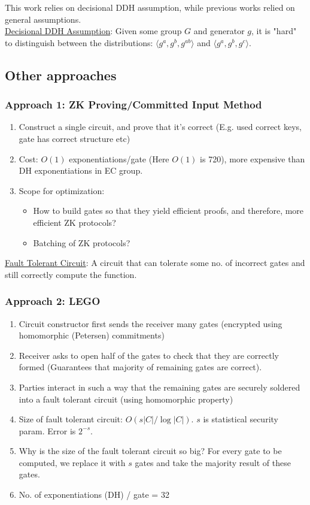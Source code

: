 This work relies on decisional DDH assumption, while previous works relied on general assumptions. \\

\underline{Decisional DDH Assumption}: Given some group $G$ and generator $g$, it is "hard" to distinguish between the distributions: $\langle g^a, g^b, g^{ab}\rangle$ and $\langle g^a, g^b, g^c\rangle$.

\subsection{Other approaches}

\subsubsection{Approach 1: ZK Proving/Committed Input Method}
\begin{enumerate}
    \item Construct a single circuit, and prove that it's correct (E.g. used correct keys, gate has correct structure etc)
    \item Cost: $O(1)$ exponentiations/gate (Here $O(1)$ is 720), more expensive than DH exponentiations in EC group.
    \item Scope for optimization:
    \begin{itemize}
        \item How to build gates so that they yield efficient proofs, and therefore, more efficient ZK protocols?
        \item Batching of ZK protocols?
    \end{itemize}
\end{enumerate}

\underline{Fault Tolerant Circuit}: A circuit that can tolerate some no. of incorrect gates and still correctly compute the function. 
\subsubsection{Approach 2: LEGO}
\begin{enumerate}
    \item Circuit constructor first sends the receiver many gates (encrypted using homomorphic (Petersen) commitments)
    \item Receiver asks to open half of the gates to check that they are correctly formed (Guarantees that majority of remaining gates are correct). 
    \item Parties interact in such a way that the remaining gates are securely soldered into a fault tolerant circuit (using homomorphic property)
    \item Size of fault tolerant circuit: $O(s|C|/\log|C|)$. $s$ is statistical security param. Error is $2^{-s}$.
    \item Why is the size of the fault tolerant circuit so big? For every gate to be computed, we replace it with $s$ gates and take the majority result of these gates.
    \item No. of exponentiations (DH) / gate = 32
\end{enumerate}

